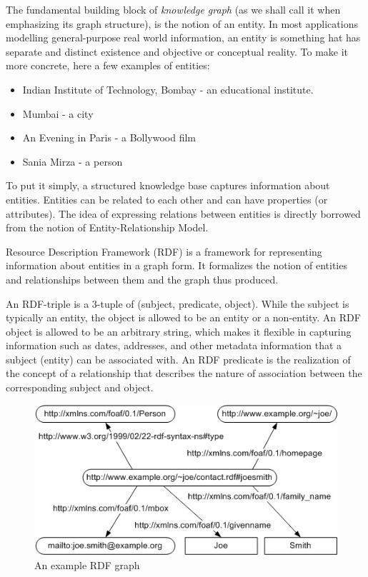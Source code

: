 \documentclass[a4paper, twoside, 12pt]{report}
\begin{document}
The fundamental building block of \emph{knowledge graph} (as we shall call it when emphasizing its graph structure), is the notion of an entity. In most applications modelling general-purpose real world information, an entity is something hat has separate and distinct existence and objective or conceptual reality. To make it more concrete, here a few examples of entities:
\begin{itemize}
  \item Indian Institute of Technology, Bombay - an educational institute.
  \item Mumbai - a city
  \item An Evening in Paris - a Bollywood film
  \item Sania Mirza - a person
\end{itemize}

To put it simply, a structured knowledge base captures information about entities. Entities can be related to each other and can have properties (or attributes). The idea of expressing relations between entities is directly borrowed from the notion of Entity-Relationship Model.

Resource Description Framework (RDF) is a framework for representing information about entities in a graph form. It formalizes the notion of entities and relationships between them and the graph thus produced. 

An RDF-triple is a 3-tuple of (subject, predicate, object). While the subject is typically an entity, the object is allowed to be an entity or a non-entity. An RDF object is allowed to be an arbitrary string, which makes it flexible in capturing information such as dates, addresses, and other metadata information that a subject (entity) can be associated with. An RDF predicate is the realization of the concept of a relationship that describes the nature of association between the corresponding subject and object.

\begin{figure}[h!]
  \includegraphics[scale=0.8]{joe-smith-rdf.jpg}
  \caption{An example RDF graph}
  \label{fig:rdfexample}
\end{figure}
\end{document}
